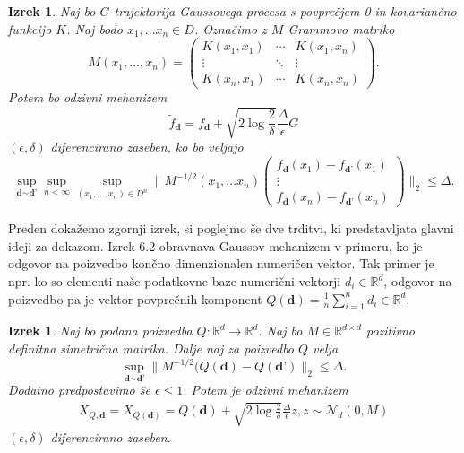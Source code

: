 \documentclass[12pt,a4paper]{amsart}
\theoremstyle{definition} %
\theoremstyle{plain} %
\newtheorem{izrek}[definicija]{Izrek}
\begin{document}
\begin{izrek}
Naj bo $G$ trajektorija Gaussovega procesa s povprečjem 0 in kovariančno funkcijo $K$. Naj bodo $x_1,...x_n \in D$. Označimo z $M$ Grammovo matriko
$$
M(x_1,...,x_n) = 
 \begin{pmatrix}
  K(x_1,x_1) & \cdots & K(x_1,x_n) \\
  \vdots    & \ddots & \vdots  \\
  K(x_n,x_1) & \cdots & K(x_n,x_n) 
 \end{pmatrix}
.$$
Potem bo odzivni mehanizem 
$$
\widetilde{f}_{\textbf{d}} = f_{\textbf{d}} + \sqrt{2\log{\frac{2}{\delta}}} \frac{\Delta}{\epsilon}G
$$
$(\epsilon, \delta)$ diferencirano zaseben, ko bo veljajo
\begin{equation}\label{meja}
\sup_{\textbf{d} \sim \textbf{d'}} \sup_{n < \infty} \sup_{(x_1,...,x_n) \in D^n} 
\bigg\|M^{-1/2}(x_1,...x_n)
\begin{pmatrix}
  f_{\textbf{d}}(x_1)-f_{\textbf{d'}}(x_1)  \\
  \vdots     \\
  f_{\textbf{d}}(x_n)-f_{\textbf{d'}}(x_n)
 \end{pmatrix}
\bigg\|_2 \leq \Delta. \tag{6}
\end{equation}
\end{izrek}
Preden dokažemo zgornji izrek, si poglejmo še dve trditvi, ki predstavljata glavni ideji za dokazom. Izrek 6.2 obravnava Gaussov mehanizem v primeru, ko je odgovor na poizvedbo končno dimenzionalen numeričen vektor. Tak primer je npr. ko so elementi naše podatkovne baze numerični vektorji $d_i \in \mathbb{R}^d$, odgovor na poizvedbo pa je vektor povprečnih komponent $Q(\textbf{d}) = \frac{1}{n} \sum_{i=1}^{n} d_i \in \mathbb{R}^d$.
\begin{izrek}
Naj bo podana poizvedba $Q: \mathbb{R}^d \rightarrow \mathbb{R}^d$. Naj bo $M \in \mathbb{R}^{d \times d}$ pozitivno definitna simetrična matrika. Dalje naj za poizvedbo $Q$ velja 
\begin{equation}\label{mejagauss}
\sup_{\textbf{d} \sim \textbf{d'}} \| M^{-1/2}(Q(\textbf{d})-Q(\textbf{d'})\|_{2} \leq \Delta. \tag{7}
\end{equation}
Dodatno predpostavimo še $\epsilon \leq 1$. Potem je odzivni mehanizem 
\begin{gather*}
X_{Q,\textbf{d}} = X_{Q(\textbf{d})} = Q(\textbf{d}) + \sqrt{2\log{\frac{2}{\delta}}} \frac{\Delta}{\epsilon} z, z \sim \mathcal{N}_d (0,M)
\end{gather*}
$(\epsilon, \delta)$ diferencirano zaseben.
\end{izrek}
\end{document}
